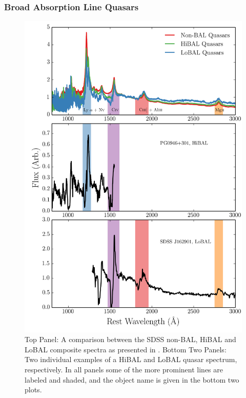 \subsubsection{Broad Absorption Line Quasars}
\label{sec:balqsos}

\begin{figure}
\centering
\includegraphics[width=1.0\textwidth]{figures/02-outflows/bal_spectra.png}
\caption
{
Top Panel: A comparison between the SDSS non-BAL, HiBAL and LoBAL
composite spectra as presented in \cite{reichard2003}. 
Bottom Two Panels: Two individual examples of a HiBAL and LoBAL quasar
spectrum, respectively. In all panels some of the more prominent
lines are labeled and shaded, and the object name is given in 
the bottom two plots.
} 
\label{fig:bals}
\end{figure}

